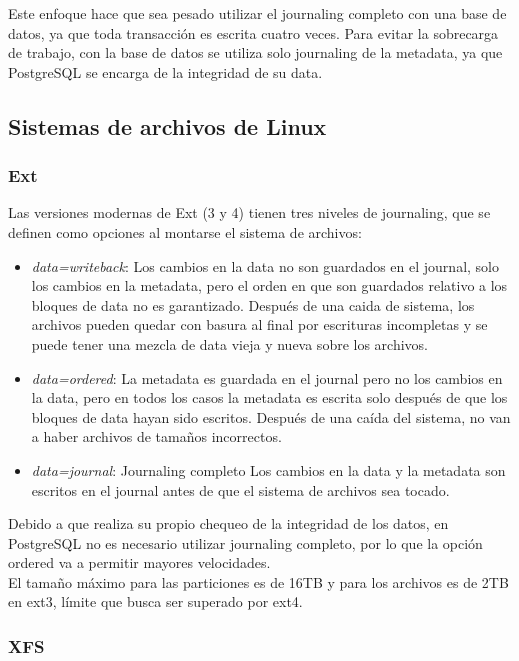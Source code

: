 Este enfoque hace que sea pesado utilizar el journaling completo con una base de datos, ya que toda transacción es escrita cuatro veces. Para evitar la sobrecarga de trabajo, con la base de datos se utiliza solo journaling de la metadata, ya que PostgreSQL se encarga de la integridad de su data.

\subsection{Sistemas de archivos de Linux}

\subsubsection{Ext}

Las versiones modernas de Ext (3 y 4) tienen tres niveles de journaling, que se definen como opciones al montarse el sistema de archivos:

\begin{itemize}
\item \textit{data=writeback}: Los cambios en la data no son guardados en el journal, solo los cambios en la metadata, pero el orden en que son guardados relativo a los bloques de data no es garantizado. Después de una caida de sistema, los archivos pueden quedar con basura al final por escrituras incompletas y se puede tener una mezcla de data vieja y nueva sobre los archivos.
\item \textit{data=ordered}: La metadata es guardada en el journal pero no los cambios en la data, pero en todos los casos la metadata es escrita solo después de que los bloques de data hayan sido escritos. Después de una caída del sistema, no van a haber archivos de tamaños incorrectos.
\item \textit{data=journal}: Journaling completo Los cambios en la data y la metadata son escritos en el journal antes de que el sistema de archivos sea tocado.
\end{itemize}

Debido a que realiza su propio chequeo de la integridad de los datos, en PostgreSQL no es necesario utilizar journaling completo, por lo que la opción ordered va a permitir mayores velocidades.\\

El tamaño máximo para las particiones es de 16TB y para los archivos es de 2TB en ext3, límite que busca ser superado por ext4.

\subsubsection{XFS}

